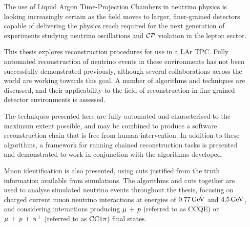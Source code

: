 The use of Liquid Argon Time-Projection Chambers in neutrino physics is looking increasingly certain as the field moves to larger, finer-grained detectors capable of delivering the physics reach required for the next generation of experiments studying neutrino oscillations and $\mathcal{C}\mathcal{P}$ violation in the lepton sector. 

This thesis explores reconstruction procedures for use in a \ac{LAr TPC}. Fully automated reconstruction of neutrino events in these environments has not been successfully demonstrated previously, although several collaborations across the world are working towards this goal. A number of algorithms and techniques are discussed, and their applicability to the field of reconstruction in fine-grained detector environments is assessed.

The techniques presented here are fully automated and characterised to the maximum extent possible, and may be combined to produce a software reconstruction chain that is free from human intervention. In addition to these algorithms, a framework for running chained reconstruction tasks is presented and demonstrated to work in conjunction with the algorithms developed.

Muon identification is also presented, using cuts justified from the truth information available from simulations. The algorithms and cuts together are used to analyse simulated neutrino events throughout the thesis, focusing on charged current muon neutrino interactions at energies of $0.77\,\mathrm{GeV}$ and $4.5\,\mathrm{GeV}$, and considering interactions producing $\mu\,+\,p$ (referred to as CCQE) or $\mu\,+\,p\,+\,\pi^{+}$ (referred to as $\mathrm{CC}1\pi$) final states.


